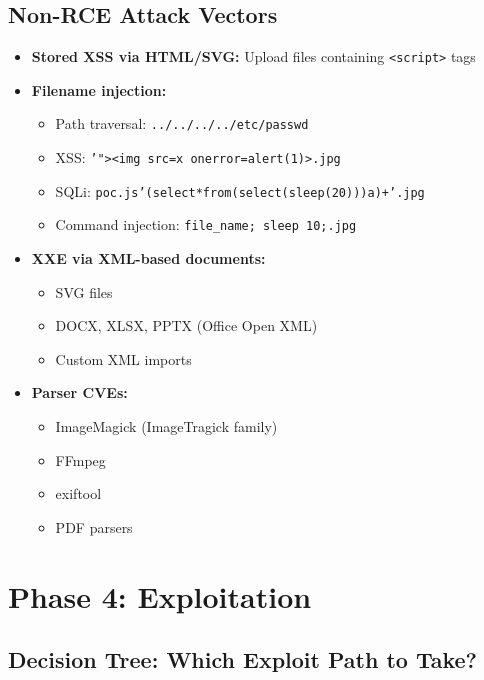 \documentclass[11pt]{article}
\begin{document}
\subsection{Non-RCE Attack Vectors}

\begin{checklistbox}
\begin{itemize}
    \item[\checkmark] \textbf{Stored XSS via HTML/SVG:} Upload files containing \texttt{<script>} tags
    \item[\checkmark] \textbf{Filename injection:}
    \begin{itemize}
        \item Path traversal: \texttt{../../../../etc/passwd}
        \item XSS: \texttt{'"><img src=x onerror=alert(1)>.jpg}
        \item SQLi: \texttt{poc.js'(select*from(select(sleep(20)))a)+'.jpg}
        \item Command injection: \texttt{file\_name; sleep 10;.jpg}
    \end{itemize}
    \item[\checkmark] \textbf{XXE via XML-based documents:}
    \begin{itemize}
        \item SVG files
        \item DOCX, XLSX, PPTX (Office Open XML)
        \item Custom XML imports
    \end{itemize}
    \item[\checkmark] \textbf{Parser CVEs:}
    \begin{itemize}
        \item ImageMagick (ImageTragick family)
        \item FFmpeg
        \item exiftool
        \item PDF parsers
    \end{itemize}
\end{itemize}
\end{checklistbox}

\section{Phase 4: Exploitation}

\subsection{Decision Tree: Which Exploit Path to Take?}
\end{document}

